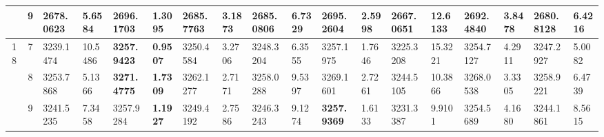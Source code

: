 \documentclass[conference]{IEEEtran}
\begin{document}
\begin{table*}[]
\begin{tabular}{|cc|ll|ll|ll|ll|ll|ll|ll|ll|}
		\multicolumn{1}{|c|}{}                            & 9                               & \multicolumn{1}{l|}{2678.0623}         & 5.6584                            & \multicolumn{1}{l|}{\textbf{2696.1703}} & \textbf{1.3095}                   & \multicolumn{1}{l|}{2685.7763}         & 3.1873                            & \multicolumn{1}{l|}{2685.0806}         & 6.7329                            & \multicolumn{1}{l|}{2695.2604}          & 2.5998                            & \multicolumn{1}{l|}{2667.0651}         & 12.6133                           & \multicolumn{1}{l|}{2692.4840}         & 3.8478                            & \multicolumn{1}{l|}{2680.8128}         & 6.4216                            \\ \hline
		\multicolumn{1}{|c|}{\multirow{3}{*}{18}}         & 7                               & \multicolumn{1}{l|}{3239.1474}         & 10.5486                           & \multicolumn{1}{l|}{\textbf{3257.9423}} & \textbf{0.9507}                   & \multicolumn{1}{l|}{3250.4584}         & 3.2706                            & \multicolumn{1}{l|}{3248.3204}         & 6.3555                            & \multicolumn{1}{l|}{3257.1975}          & 1.7646                            & \multicolumn{1}{l|}{3225.3208}         & 15.3221                           & \multicolumn{1}{l|}{3254.7127}         & 4.2911                            & \multicolumn{1}{l|}{3247.2927}         & 5.0082                            \\ \cline{2-18} 
		\multicolumn{1}{|c|}{}                            & 8                               & \multicolumn{1}{l|}{3253.7868}         & 5.1366                            & \multicolumn{1}{l|}{\textbf{3271.4775}} & \textbf{1.7309}                   & \multicolumn{1}{l|}{3262.1277}         & 2.7171                            & \multicolumn{1}{l|}{3258.0288}         & 9.5397                            & \multicolumn{1}{l|}{3269.1601}          & 2.7261                            & \multicolumn{1}{l|}{3244.5105}         & 10.3866                           & \multicolumn{1}{l|}{3268.0538}         & 3.3305                            & \multicolumn{1}{l|}{3258.9221}         & 6.4739                            \\ \cline{2-18} 
		\multicolumn{1}{|c|}{}                            & 9                               & \multicolumn{1}{l|}{3241.5235}         & 7.3458                            & \multicolumn{1}{l|}{3257.9284}          & \textbf{1.1927}                   & \multicolumn{1}{l|}{3249.4192}         & 2.7586                            & \multicolumn{1}{l|}{3246.3243}         & 9.1274                            & \multicolumn{1}{l|}{\textbf{3257.9369}} & 1.6133                            & \multicolumn{1}{l|}{3231.3387}         & 9.9101                            & \multicolumn{1}{l|}{3254.5689}         & 4.1680                            & \multicolumn{1}{l|}{3244.1861}         & 8.5615                            \\ \hline

\end{tabular}
\end{table*}
\end{document}
